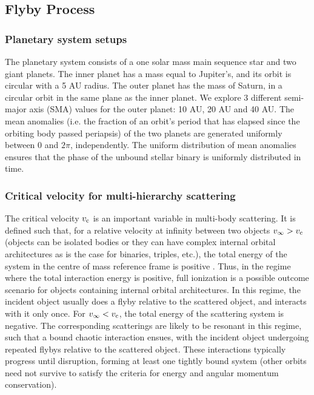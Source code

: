\documentclass[twocolumn]{aastex63}
\begin{document}
\subsection{Flyby Process}

\subsubsection{Planetary system setups}
The planetary system consists of a one solar mass main sequence star and two giant planets. The inner planet has a mass equal to Jupiter's, and its orbit is circular with a 5 AU radius. The outer planet has the mass of Saturn, in a circular orbit in the same plane as the inner planet. We explore 3 different semi-major axis (SMA) values for the outer planet: 10 AU, 20 AU and 40 AU. The mean anomalies (i.e. the fraction of an orbit's period that has elapsed since the orbiting body passed periapsis) of the two planets are generated uniformly between $0$ and $2\pi$, independently. The uniform distribution of mean anomalies ensures that the phase of the unbound stellar binary is uniformly distributed in time. 



\subsubsection{Critical velocity for multi-hierarchy scattering}
The critical velocity $v_{\rm c}$ is an important variable in multi-body scattering. It is defined such that, for a relative velocity at infinity between two objects $v_\infty > v_{\rm c}$ (objects can be isolated bodies or they can have complex internal orbital architectures as is the case for binaries, triples, etc.), the total energy of the system in the centre of mass reference frame is positive \citep[e.g.][]{fregeau04,leigh12,leigh16a,leigh16b}. Thus, in the regime where the total interaction energy is positive, full ionization is a possible outcome scenario for objects containing internal orbital architectures.  In this regime, the incident object usually does a flyby relative to the scattered object, and interacts with it only once. For $v_\infty < v_{\rm c}$, the total energy of the scattering system is negative. The corresponding scatterings are likely to be resonant in this regime, such that a bound chaotic interaction ensues, with the incident object undergoing repeated flybys relative to the scattered object.  These interactions typically progress until disruption, forming at least one tightly bound system (other orbits need not survive to satisfy the criteria for energy and angular momentum conservation).
\end{document}
